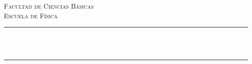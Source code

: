 \begin{singlespace}%
\begin{center}%
\begin{center}
\UCR
\end{center}
\vspace*{15 mm}%

\CURF
\LARGE{\textsc{Facultad de Ciencias Básicas}} \\
\LARGE{\textsc{Escuela de Física}}

\vfill
\vspace*{20 mm}

\rule{\textwidth}{1.5pt}%

\reportnum\\
\vspace*{5 mm}
\\
\rule{\textwidth}{0.1pt}%
\vfill%

\vfill
{}\\
\\
\vfill
{}


\end{center}
\end{singlespace}
\thispagestyle{empty}%
